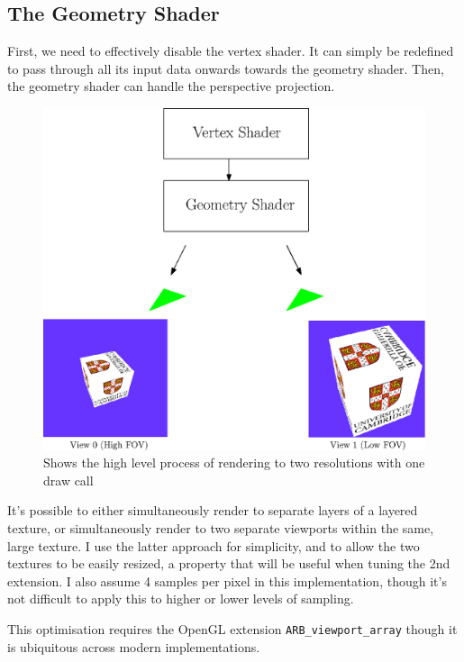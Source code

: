 \documentclass[12pt,a4paper,twoside,openright]{report}
\begin{document}
\subsection{The Geometry Shader}

First, we need to effectively disable the vertex shader. It can simply be redefined to pass through all its input data onwards towards the geometry shader.
Then, the geometry shader can handle the perspective projection.

\begin{figure}[tbh]
\centerline{\includegraphics[scale=0.6]{figs/geoshader.eps}}
\caption{Shows the high level process of rendering to two resolutions with one draw call}
\label{epsfig1}
\end{figure}

It's possible to either simultaneously render to separate layers of a layered texture, or simultaneously render to two separate viewports within the same, large texture. I use the latter approach for simplicity, and to allow the two textures to be easily resized, a property that will be useful when tuning the 2nd extension. I also assume 4 samples per pixel in this implementation, though it's not difficult to apply this to higher or lower levels of sampling. 

This optimisation requires the OpenGL extension \texttt{ARB\_viewport\_array} \cite{arbViewport} though it is ubiquitous across modern implementations.
\end{document}
